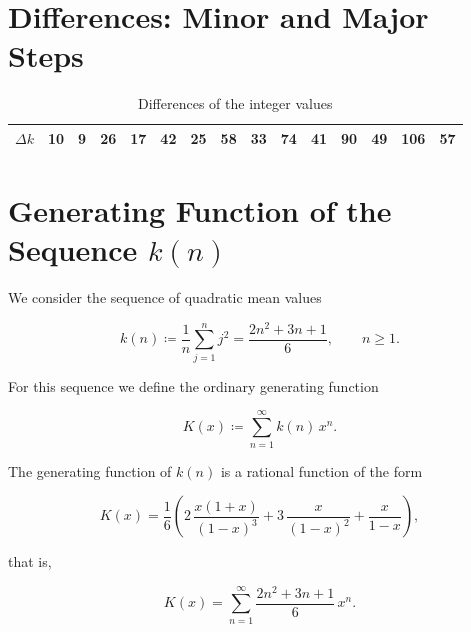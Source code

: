 \section{Differences: Minor and Major Steps}

\begin{table}[htbp]
\centering
\caption{Differences of the integer values}
\begin{tabular}{*{15}{c}}
\toprule
$\Delta k$ & 10 & 9 & 26 & 17 & 42 & 25 & 58 & 33 & 74 & 41 & 90 & 49 & 106 & 57 \\
\bottomrule
\end{tabular}
\end{table}

\section{Generating Function of the Sequence \texorpdfstring{$k(n)$}{k(n)}}

We consider the sequence of quadratic mean values


\[
  k(n) \coloneqq \frac{1}{n}\sum_{j=1}^{n} j^{2}
  = \frac{2n^{2} + 3n + 1}{6}, \qquad n \ge 1.
\]



For this sequence we define the ordinary generating function


\[
  K(x) \coloneqq \sum_{n=1}^{\infty} k(n)\,x^{n}.
\]



\begin{satz}
The generating function of $k(n)$ is a rational function of the form


\[
  K(x)
  = \frac{1}{6}\left(
      2\,\frac{x(1+x)}{(1-x)^{3}}
      + 3\,\frac{x}{(1-x)^{2}}
      + \frac{x}{1-x}
    \right),
\]


that is,


\[
  K(x) = \sum_{n=1}^{\infty} \frac{2n^{2} + 3n + 1}{6}\,x^{n}.
\]


\end{satz}

